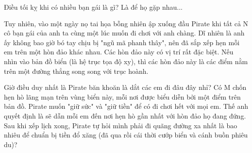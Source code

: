 Điều tối kỵ khi có nhiều bạn gái là gì? Là để họ gặp nhau...  

   Tuy nhiên, vào một ngày nọ tai họa bỗng nhiên ập xuống đầu Pirate khi tất cả N cô bạn gái của anh ta cùng một lúc muốn đi chơi với anh chàng. Dĩ nhiên là anh ấy không bao giờ bó tay chịu bị "ngũ mã phanh thây", nên đã sắp xếp hẹn mỗi em trên một hòn đảo khác nhau. Các hòn đảo này có vị trí rất đặc biệt. Nếu nhìn vào bản đồ biển (là hệ trục tọa độ xy), thì các hòn đảo này là các điểm nằm trên một đường thẳng song song với trục hoành.  

   Giờ điều duy nhất là Pirate băn khoăn là dắt các em đi đâu đây nhỉ? Có M chốn hẹn hò lãng mạn trên vùng biển này, mỗi nơi được biểu diễn bởi một điểm trên bản đồ. Pirate muốn "giữ sức" và "giữ tiền" để có đi chơi hết với mọi em. Thế anh quyết định là sẽ dẫn mỗi em đến nơi hẹn hò gần nhất với hòn đảo họ đang đứng. Sau khi xếp lịch xong, Pirate tự hỏi mình phải đi quãng đường xa nhất là bao nhiêu để chuẩn bị tiền đổ xăng (đã qua rồi cái thời cướp biển và cánh buồn phiêu du)?